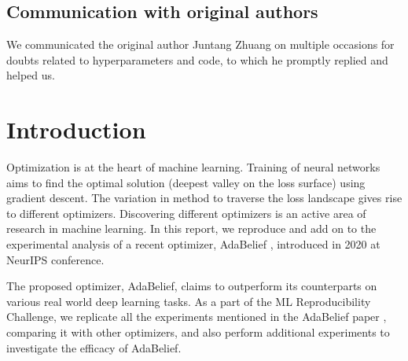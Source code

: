 \subsection*{Communication with original authors}
We communicated the original author Juntang Zhuang on multiple occasions for doubts related to hyperparameters and code, to which he promptly replied and helped us.


\newpage
\section{Introduction}
\label{intro}
Optimization is at the heart of machine learning. Training of neural networks aims to find the optimal solution (deepest valley on the loss surface) using gradient descent. The variation in method to traverse the loss landscape gives rise to different optimizers. Discovering different optimizers is an active area of research in machine learning.
In this report, we reproduce and add on to the experimental analysis of a recent optimizer, AdaBelief \cite{zhuang_adabelief_2020}, introduced in 2020 at NeurIPS conference.

\par
The proposed optimizer, AdaBelief, claims to outperform its counterparts on various real world deep learning tasks. As a part of the ML Reproducibility Challenge, we replicate all the experiments mentioned in the AdaBelief paper \cite{zhuang_adabelief_2020}, comparing it with other optimizers, and also perform additional experiments to investigate the efficacy of AdaBelief.

\par



